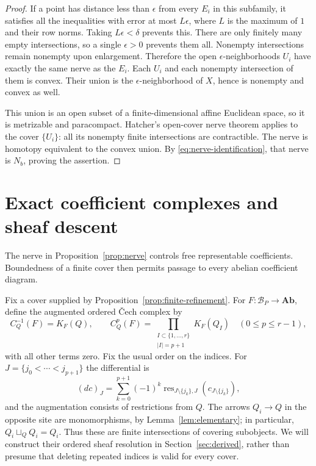 \documentclass[11pt]{article}
\theoremstyle{definition}
\theoremstyle{remark}
\newcommand{\Ab}{\mathbf{Ab}}
\newcommand{\cB}{\mathcal B}
\begin{document}
\begin{proof}
If a point has distance less than $\epsilon$ from every $E_i$ in this subfamily, it satisfies all the inequalities with error at most $L\epsilon$, where $L$ is the maximum of $1$ and their row norms. Taking $L\epsilon<\delta$ prevents this. There are only finitely many empty intersections, so a single $\epsilon>0$ prevents them all. Nonempty intersections remain nonempty upon enlargement. Therefore the open $\epsilon$-neighborhoods $U_i$ have exactly the same nerve as the $E_i$. Each $U_i$ and each nonempty intersection of them is convex. Their union is the $\epsilon$-neighborhood of $X$, hence is nonempty and convex as well.

This union is an open subset of a finite-dimensional affine Euclidean space, so it is metrizable and paracompact. Hatcher's open-cover nerve theorem \cite[Corollary 4G.3, p.~459]{hatcher} applies to the cover $\{U_i\}$: all its nonempty finite intersections are contractible. The nerve is homotopy equivalent to the convex union. By \eqref{eq:nerve-identification}, that nerve is $N_b$, proving the assertion.
\end{proof}

\section{Exact coefficient complexes and sheaf descent}

The nerve in Proposition~\ref{prop:nerve} controls free representable coefficients. Boundedness of a finite cover then permits passage to every abelian coefficient diagram.

Fix a cover supplied by Proposition~\ref{prop:finite-refinement}. For $F:\cB_P\to\Ab$, define the augmented ordered \v{C}ech complex by
\begin{equation}\label{eq:ordered-cech}
 C_Q^{-1}(F)=K_F(Q),\qquad
 C_Q^p(F)=\prod_{\substack{I\subset\{1,\ldots,r\}\\|I|=p+1}}K_F(Q_I)
 \quad(0\leq p\leq r-1),
\end{equation}
with all other terms zero. Fix the usual order on the indices. For $J=\{j_0<\cdots<j_{p+1}\}$ the differential is
\[
 (dc)_J=\sum_{k=0}^{p+1}(-1)^k
 \operatorname{res}_{J\setminus\{j_k\},J}(c_{J\setminus\{j_k\}}),
\]
and the augmentation consists of restrictions from $Q$. The arrows $Q_i\to Q$ in the opposite site are monomorphisms, by Lemma~\ref{lem:elementary}; in particular, $Q_i\sqcup_Q Q_i=Q_i$. 
Thus these are finite intersections of covering subobjects. We will construct their ordered sheaf resolution in Section~\ref{sec:derived}, rather than presume that deleting repeated indices is valid for every cover.
\end{document}
